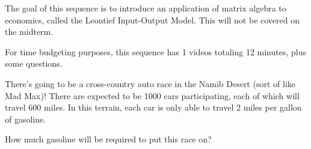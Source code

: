 






The goal of this sequence is to introduce an application of matrix algebra to economics, called the Leontief
Input-Output Model.  This will not be covered on the midterm.  


For time budgeting purposes, this sequence has 1 videos totaling 12 minutes, 
plus some questions.  




\endedxtext

\endedxvertical





There's going to be a cross-country auto race in the Namib Desert (sort of like Mad Max)!  There are expected to be
1000 cars participating, each of which will travel 600 miles.  In this terrain, each car is only
able to travel 2 miles per gallon of gasoline.
  
How much gasoline will be required to put this race on?  


 
\endedxproblem


\endedxvertical





\endedxvertical
